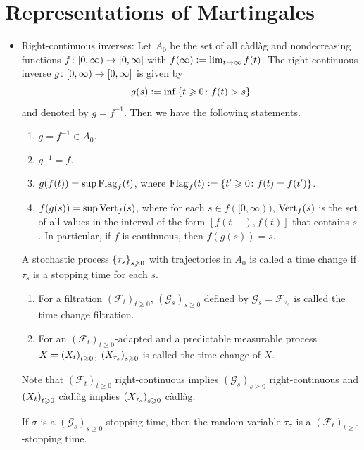 \documentclass[a4paper,12pt]{article}
\begin{document}
\section{Representations of Martingales}
\begin{itemize}
  \item Right-continuous inverses: Let $A_0$ be the set of all c\`adl\`ag and nondecreasing functions $f \colon [0,\infty) \rightarrow [0,\infty]$ with $f(\infty) \vcentcolon= \lim_{t \rightarrow \infty}f(t)$. The right-continuous inverse $g \colon [0,\infty) \rightarrow [0, \infty]$ is given by
  \begin{equation*}
    g(s) \vcentcolon= \inf \left\{t \geqslant 0 \colon f(t) > s\right\}
  \end{equation*}
  and denoted by $g = f^{-1}$. Then we have the following statements.
  \begin{enumerate}[label=(\arabic*)]
    \item $g = f^{-1} \in A_0$.
    \item $g^{-1} = f$.
    \item $g(f(t)) = \sup \operatorname{Flag}_f(t)$, where $\operatorname{Flag}_f(t) \vcentcolon= \left\{t^{\prime} \geqslant 0 \colon f(t) = f(t^{\prime})\right\}$.
    \item $f(g(s)) = \sup \operatorname{Vert}_f(s)$, where for each $s \in f([0,\infty))$, $\operatorname{Vert}_f(s)$ is the set of all values in the interval of the form $[f(t-),f(t)]$ that contains $s$. In particular, if $f$ is continuous, then $f(g(s))=s$.
  \end{enumerate}

  \noindent A stochastic process $\left\{\tau_s\right\}_{s \geqslant 0}$ with trajectories in $A_0$ is called a time change if $\tau_s$ is a stopping time for each $s$.
  \begin{enumerate}[label=(\arabic*)]
    \item For a filtration $(\mathcal{F}_t)_{t \geqslant 0}$, $(\mathcal{G}_s)_{s \geqslant 0}$ defined by $\mathcal{G}_s = \mathcal{F}_{\tau_s}$ is called the time change filtration.
    \item For an $(\mathcal{F}_t)_{t \geqslant 0}$-adapted and a predictable measurable process $X = \left(X_t\right)_{t \geqslant 0}$, $\left(X_{\tau_s}\right)_{s \geqslant 0}$ is called the time change of $X$. 
  \end{enumerate}
  Note that $(\mathcal{F}_t)_{t \geqslant 0}$ right-continuous implies $(\mathcal{G}_s)_{s \geqslant 0}$ right-continuous and $\left(X_t\right)_{t \geqslant 0}$ c\`adl\`ag implies $\left(X_{\tau_s}\right)_{s \geqslant 0}$ c\`adl\`ag.

  \begin{prop}
    If $\sigma$ is a $(\mathcal{G}_s)_{s \geqslant 0}$-stopping time, then the random variable $\tau_{\sigma}$ is a $(\mathcal{F}_t)_{t \geqslant 0}$-stopping time.
  \end{prop}


\end{itemize}
\end{document}
